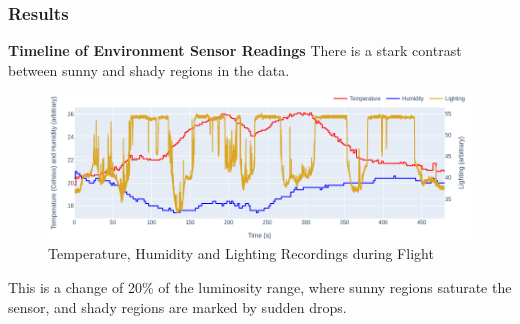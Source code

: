     
\pagebreak
\subsubsection{Results}


\textbf{Timeline of Environment Sensor Readings} \hspace{0.3cm} There is a stark contrast between sunny and shady regions in the data.



\begin{figure}[!h]
    \raggedright
    \includegraphics[width=12cm]{images/stage_graphs/environment_results/arduino_plot.png}
    \caption{Temperature, Humidity and Lighting Recordings during Flight}
\end{figure}


 This is a change of 20\% of the luminosity range, where sunny regions saturate the sensor, and shady regions are marked by sudden drops. 


